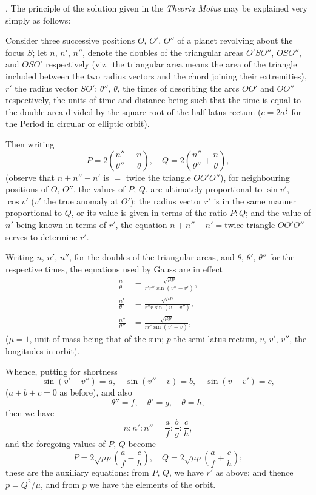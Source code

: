 \documentclass[11pt,a4paper]{article}
\theoremstyle{definition}
\begin{document}
\smallskip

. The principle of the solution given in the \textit{Theoria Motus} may be explained very
simply as follows:

Consider three successive positions $O$, $O'$, $O''$ of a planet revolving about the
focus $S$; let $n$, $n'$, $n''$, denote the doubles of the triangular areas $O'SO''$, $OSO''$, and
$OSO'$ respectively (viz.~the triangular area means the area of the triangle included
between the two radius vectors and the chord joining their extremities), $r'$ the radius
vector $SO'$; $\theta''$, $\theta$, the times of describing the arcs $OO'$ and $OO''$ respectively, the
units of time and distance being such that the time is equal to the double area
divided by the square root of the half latus rectum ($c=2a^{\frac32}$ for the Period in
circular or elliptic orbit).

Then writing
\[
P = 2\left(\frac{n''}{\theta''} - \frac{n}{\theta}\right), \quad
Q = 2\left(\frac{n''}{\theta''} + \frac{n}{\theta}\right),
\]
(observe that $n+n''-n'$ is $=$ twice the triangle $OO'O''$), for neighbouring positions of
$O$, $O''$, the values of $P$, $Q$, are ultimately proportional to $\sin v'$, $\cos v'$ ($v'$ the true
anomaly at $O'$); the radius vector $r'$ is in the same manner proportional to $Q$, or its
value is given in terms of the ratio $P:Q$; and the value of $n'$ being known in terms
of $r'$, the equation $n+n''-n'=\text{twice triangle }OO'O''$ serves to determine $r'$.

\newpage
\noindent
Writing $n$, $n'$, $n''$, for the doubles of the triangular areas, and $\theta$, $\theta'$, $\theta''$ for the
respective times, the equations used by Gauss are in effect
\begin{align*}
\frac{n}{\theta} &= \frac{\sqrt{\mu p}}{r'r''\sin(v''-v')}, \\
\frac{n'}{\theta'} &= \frac{\sqrt{\mu p}}{r''r\sin(v-v'')}, \\
\frac{n''}{\theta''} &= \frac{\sqrt{\mu p}}{rr'\sin(v'-v)},
\end{align*}
($\mu=1$, unit of mass being that of the sun; $p$ the semi-latus rectum, $v$, $v'$, $v''$, the
longitudes in orbit).

Whence, putting for shortness
\[
\sin(v'-v'') = a, \quad \sin(v''-v) = b, \quad \sin(v-v') = c,
\]
($a+b+c=0$ as before), and also
\[
\theta'' = f, \quad \theta' = g, \quad \theta = h,
\]
then we have
\[
n : n' : n'' = \frac{a}{f} : \frac{b}{g} : \frac{c}{h},
\]
and the foregoing values of $P$, $Q$ become
\[
P = 2\sqrt{\mu p}\left(\frac{a}{f} - \frac{c}{h}\right), \quad
Q = 2\sqrt{\mu p}\left(\frac{a}{f} + \frac{c}{h}\right);
\]
these are the auxiliary equations: from $P$, $Q$, we have $r'$ as above; and thence
$p=Q^2/\mu$, and from $p$ we have the elements of the orbit.
\end{document}

